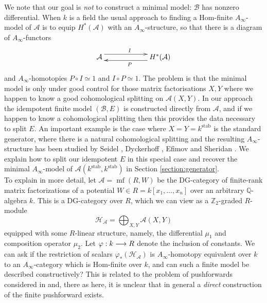 \documentclass[english,letter paper,12pt,leqno]{article}
\theoremstyle{example}
\numberwithin{equation}{section}
\def\AA{\mathcal{A}}
\def\BB{\mathcal{B}}
\def\HH{\HH}
\def\HH{\mathcal{H}}
\def\stab{\operatorname{stab}}
\def\nZ{\mathds{Z}}
\DeclareMathOperator{\mfdg}{mf}
\begin{document}
We note that our goal is \emph{not} to construct a minimal model: $\BB$ has nonzero differential. When $k$ is a field the usual approach to finding a Hom-finite $A_\infty$-model of $\AA$ is to equip $H^*(\AA)$ with an $A_\infty$-structure, so that there is a diagram of $A_\infty$-functors
\[
\xymatrix@C+3pc{
\AA \ar@<1ex>[r]^I & H^*(\AA) \ar@<1ex>[l]^P
}
\]
and $A_\infty$-homotopies $P \circ I \simeq 1$ and $I \circ P \simeq 1$. The problem is that the minimal model is only under good control for those matrix factorisations $X,Y$ where we happen to know a good cohomological splitting on $\AA(X,Y)$. In our approach the idempotent finite model $(\BB,E)$ is constructed directly from $\AA$, and if we happen to know a cohomological splitting then this provides the data necessary to split $E$. An important example is the case where $X = Y = k^{\stab}$ is the standard generator, where there is a natural cohomological splitting and the resulting $A_\infty$-structure has been studied by Seidel \cite[\S 11]{seidel_hms}, Dyckerhoff \cite[\S 5.6]{d0904.4713}, Efimov \cite[\S 7]{efimov} and Sheridan \cite{sheridan}. We explain how to split our idempotent $E$ in this special case and recover the minimal $A_\infty$-model of $\AA(k^{\stab},k^{\stab})$ in Section \ref{section:generator}. 
\\

To explain in more detail, let $\AA = \mfdg(R,W)$ be the DG-category of finite-rank matrix factorizations of a potential $W \in R = k[x_1,\ldots,x_n]$ over an arbitrary $\mathbb{Q}$-algebra $k$. This is a DG-category over $R$, which we can view as a $\nZ_2$-graded $R$-module
\[
\HH_{\AA} = \bigoplus_{X,Y} \AA(X,Y)
\]
equipped with some $R$-linear structure, namely, the differential $\mu_1$ and composition operator $\mu_2$. Let $\varphi: k \longrightarrow R$ denote the inclusion of constants. We can ask if the restriction of scalars $\varphi_*( \HH_{\AA} )$ is $A_\infty$-homotopy equivalent over $k$ to an $A_\infty$-category which is Hom-finite over $k$, and can such a finite model be described constructively? This is related to the problem of pushforwards considered in \cite{pushforward} and, there as here, it is unclear that in general a \emph{direct} construction of the finite pushforward exists.
\end{document}

